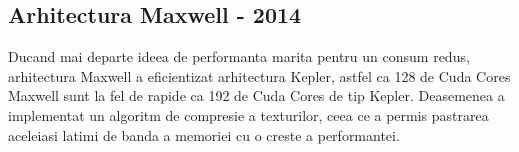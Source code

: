 \subsection{Arhitectura Maxwell - 2014}

Ducand mai departe ideea de performanta marita pentru un consum redus, arhitectura Maxwell a
eficientizat arhitectura Kepler, astfel ca 128 de Cuda Cores Maxwell sunt la fel de rapide ca 192
de Cuda Cores de tip Kepler. Deasemenea a implementat un algoritm de compresie a texturilor, ceea
ce a permis pastrarea aceleiasi latimi de banda a memoriei cu o creste a performantei.

